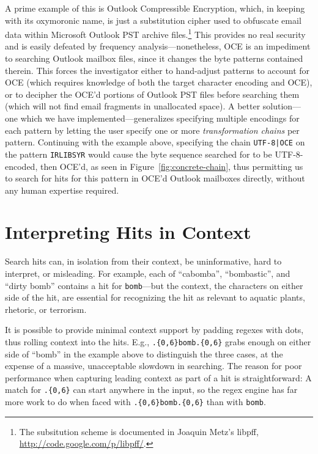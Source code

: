 \documentclass[5p,final,number,sort&compress]{elsarticle}
\newcommand{\re}[1]{\texttt{#1}}
\begin{document}
A prime example of this is Outlook Compressible Encryption, which, in keeping with its oxymoronic name, is just a substitution cipher used to obfuscate email data within Microsoft Outlook PST archive files.\footnote{The subsitution scheme is documented in Joaquin Metz's libpff, \url{http://code.google.com/p/libpff/}.} This provides no real security and is easily defeated by frequency analysis---nonetheless, OCE is an impediment to searching Outlook mailbox files, since it changes the byte patterns contained therein. This forces the investigator either to hand-adjust patterns to account for OCE (which requires knowledge of both the target character encoding and OCE), or to decipher the OCE'd portions of Outlook PST files before searching them (which will not find email fragments in unallocated space). A better solution---one which we have implemented---generalizes specifying multiple encodings for each pattern by letting the user specify one or more \emph{transformation chains} per pattern. Continuing with the example above, specifying the chain \texttt{UTF-8|OCE} on the pattern \texttt{IRLIBSYR} would cause the byte sequence searched for to be UTF-8-encoded, then OCE'd, as seen in Figure~\ref{fig:concrete-chain}, thus permitting us to search for hits for this pattern in OCE'd Outlook mailboxes directly, without any human expertise required.

\section{Interpreting Hits in Context}

Search hits can, in isolation from their context, be uninformative, hard to interpret, or misleading. For example, each of ``cabomba'', ``bombastic'', and ``dirty bomb'' contains a hit for \re{bomb}---but the context, the characters on either side of the hit, are essential for recognizing the hit as relevant to aquatic plants, rhetoric, or terrorism. 

It is possible to provide minimal context support by padding regexes with dots,  thus rolling context into the hits. E.g., \re{.\{0,6\}bomb.\{0,6\}} grabs enough on either side of ``bomb'' in the example above to distinguish the three cases, at the expense of a massive, unacceptable slowdown in searching. The reason for poor performance when capturing leading context as part of a hit is straightforward: A match for \re{.\{0,6\}} can start anywhere in the input, so the regex engine has far more work to do when faced with \re{.\{0,6\}bomb.\{0,6\}} than with \re{bomb}.
\end{document}
